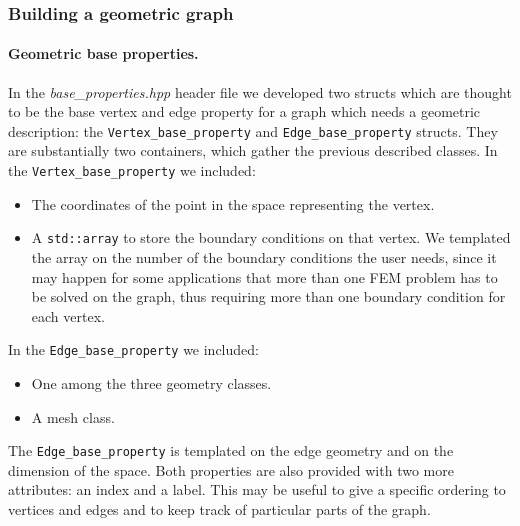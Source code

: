 \documentclass[10pt]{article} %
\newcommand{\classname}[1]{\texttt{#1}}
\begin{document}
	\subsubsection{Building a geometric graph}		
	\paragraph{Geometric base properties.} In the \textit{base\_properties.hpp} header file we developed two structs which are thought to be the base vertex and edge property for a graph which needs a geometric description: the \classname{Vertex\_base\_property} and \classname{Edge\_base\_property} structs. They are substantially two containers, which gather the previous described classes.
	In the \classname{Vertex\_base\_property} we included:
	\begin{itemize}
		\item The coordinates of the point in the space representing the vertex.
		\item A \texttt{std::array} to store the boundary conditions on that vertex. We templated the array on the number of the boundary conditions the user needs, since it may happen for some applications that more than one FEM problem has to be solved on the graph, thus requiring more than one boundary condition for each vertex.
	\end{itemize}
	In the \classname{Edge\_base\_property} we included:
	\begin{itemize}
		\item One among the three geometry classes.
		\item A mesh class.
	\end{itemize}
	The \classname{Edge\_base\_property} is templated on the edge geometry and on the dimension of the space. \newline
	Both properties are also provided with two more attributes: an index and a label. This may be useful to give a specific ordering to vertices and edges and to keep track of particular parts of the graph.
\end{document}
